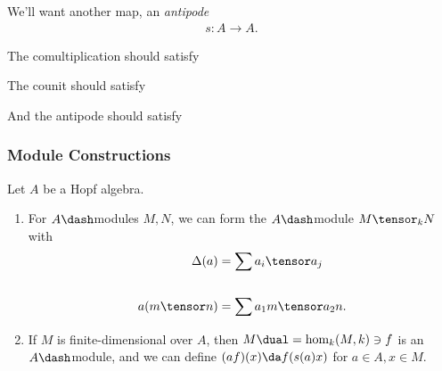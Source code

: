 We'll want another map, an \emph{antipode}
\begin{align*}  
s: A\to A
.\end{align*}

The comultiplication should satisfy

\begin{center}
\end{center}

The counit should satisfy

\begin{center}
\end{center}

And the antipode should satisfy

\begin{center}
\end{center}

\hypertarget{module-constructions}{%
\subsubsection{Module Constructions}\label{module-constructions}}

Let \(A\) be a Hopf algebra.

\begin{enumerate}
\def\labelenumi{\arabic{enumi}.}
\item
  For \(A\dash\)modules \(M, N\), we can form the \(A\dash\)module
  \(M\tensor_k N\) with
  \begin{align*}  
  \Delta(a) &= \sum a_i \tensor a_j \\ \\
  a(m\tensor n) &= \sum a_1 m \tensor a_2 n
  .\end{align*}
\item
  If \(M\) is finite-dimensional over \(A\), then
  \(M\dual = \hom_k(M, k) \ni f\) is an \(A\dash\)module, and we can
  define \((af)(x) \da f(s(a)x)\) for \(a\in A, x\in M\).
\end{enumerate}


